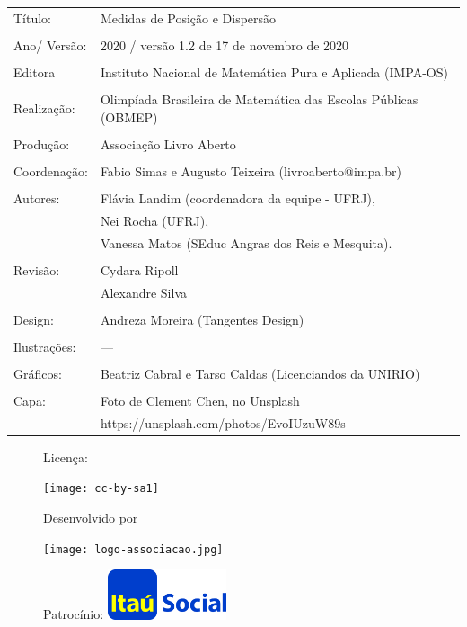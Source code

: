 \begin{tabular}{p{}p{}}
Título: & Medidas de Posição e Dispersão\\
\\
Ano/ Versão: & 2020 / versão 1.2 de 17 de novembro de 2020\\
\\
Editora & Instituto Nacional de Matem\'atica Pura e Aplicada (IMPA-OS)\\
\\
Realização:& Olimp\'iada Brasileira de Matem\'atica das Escolas P\'ublicas (OBMEP)\\
\\
Produção:& Associação Livro Aberto\\
\\
Coordenação: & Fabio Simas e Augusto Teixeira (livroaberto@impa.br)\\
\\
  Autores: & Flávia Landim (coordenadora da equipe - UFRJ),\\
        & Nei Rocha (UFRJ),\\
             & Vanessa Matos (SEduc Angras dos Reis e Mesquita).\\
\\
Revisão: &  Cydara Ripoll  \\
		 &  Alexandre Silva \\
\\
Design: & Andreza Moreira (Tangentes Design) \\
\\
  Ilustrações: & --- \\ 
\\
Gráficos: & Beatriz Cabral e Tarso Caldas (Licenciandos da UNIRIO)\\
\\
  Capa: & Foto de Clement Chen, no Unsplash\\
  		& https://unsplash.com/photos/EvoIUzuW89s \\

\end{tabular}


\begin{figure}[b]
\begin{minipage}[l]{5cm}
\centering

{\large Licença:}

  \texttt{[image: cc-by-sa1]}
\end{minipage}\hfill
\begin{minipage}[c]{5cm}
\centering
{\large Desenvolvido por}

\texttt{[image: logo-associacao.jpg]}
\end{minipage}
\begin{minipage}[r]{5cm}
\centering

{\large Patrocínio:}
  \vspace{1em}
  \includegraphics[width=3.5cm]{itau}
\end{minipage}
\end{figure}

